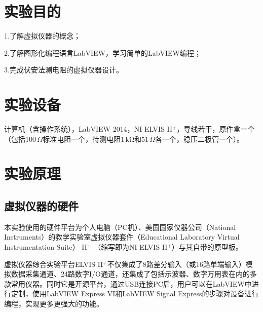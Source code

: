 \documentclass[UTF8]{article}
\theoremstyle{MyLineTheoremStyle} %
\theoremstyle{MyBlockTheoremStyle} %
\theoremstyle{MySubsubsectionStyle} %
\begin{document}

\newpage
{}





\section{实验目的}
1.了解虚拟仪器的概念；

2.了解图形化编程语言LabVIEW，学习简单的LabVIEW编程；

3.完成伏安法测电阻的虚拟仪器设计。

\section{实验设备}
计算机（含操作系统），LabVIEW 2014，NI ELVIS II$ ^+ $，导线若干，原件盒一个（包括$ 100\,\Omega $标准电阻一个，待测电阻$ 1\,\mathrm{k\Omega} $和$ 51\,\Omega $各一个，稳压二极管一个）。
\section{实验原理}
\subsection{虚拟仪器的硬件}
本实验使用的硬件平台为个人电脑（PC机）、美国国家仪器公司（National Instruments）的教学实验室虚拟仪器套件（Educational Laboratory Virtual Instrumentation Suite） II$ ^+ $ （缩写即为NI ELVIS II$ ^+ $）与其自带的原型板。

虚拟仪器综合实验平台ELVIS II$ ^+ $不仅集成了8路差分输入（或16路单端输入）模拟数据采集通道、24路数字I/O通道，还集成了包括示波器、数字万用表在内的多款常用仪器。同时它是开源平台，通过USB连接PC后，用户可以在LabVIEW中进行定制，使用LabVIEW Express VI和LabVIEW Signal Express的步骤对设备进行编程，实现更多更强大的功能。	
\end{document}
